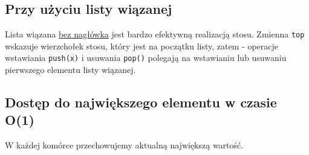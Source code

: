 \documentclass[algorytmy.tex]{subfiles}
\begin{document}
    \subsection{Przy użyciu listy wiązanej}
    Lista wiązana \underline{bez nagłówka} jest bardzo efektywną realizacją
    stosu. Zmienna \texttt{top} wskazuje wierzchołek stosu, który jest na
    początku listy, zatem - operacje wstawiania \texttt{push(x)} i usuwania
    \texttt{pop()} polegają na wstawianiu lub usuwaniu pierwszego elementu
    listy wiązanej.

    \subsection{Dostęp do największego elementu w czasie O(1)}
    W każdej komórce przechowujemy aktualną największą wartość.
\end{document}
